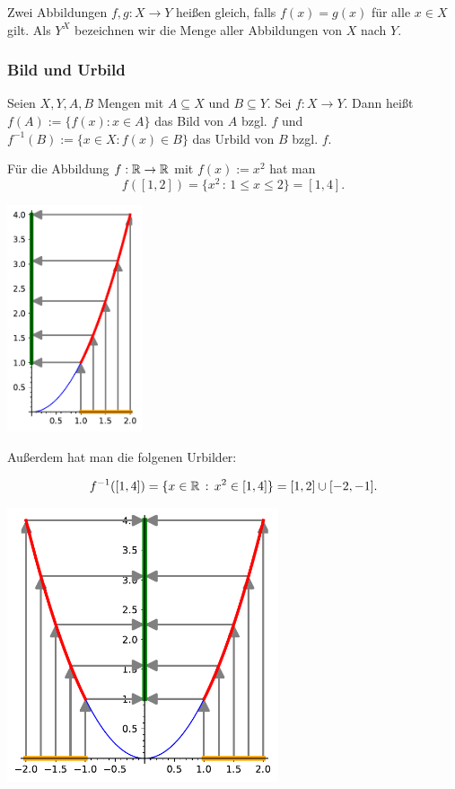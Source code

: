 Zwei Abbildungen $ f,g : X \to Y $ heißen gleich, falls $ f(x) = g(x) $ für alle $ x \in X $ gilt. Als $ Y^X $ bezeichnen wir die Menge aller Abbildungen von $ X $ nach $ Y $.

\subsubsection{Bild und Urbild}

Seien $ X,Y,A,B $ Mengen mit $ A \subseteq X $ und $ B \subseteq Y $. Sei $ f : X \to Y $. Dann heißt $ f(A) := \{ f(x) : x \in A \} $ das Bild von $ A $ bzgl. $ f $ und $ f^{-1}(B) := \{ x \in X : f(x) \in B \} $ das Urbild von $ B $ bzgl. $ f $.

\begin{bsp}
	Für die Abbildung $ f : \mathbb R \to \mathbb R $ mit $ f(x) := x^2 $ hat man 
	\[
		 f( [1,2] ) = \{ x^2 \,:\, 1 \le x \le 2\} = [1,4] .
	\]
\begin{center}
	\includegraphics[width=0.3\textwidth]{sage/bild_abb.pdf}
\end{center} 
	
	Außerdem hat man die folgenen Urbilder: 
	
	\[
		 f^{-1}( [1,4] ) = \{ x \in \mathbb R \,:\, x^2  \in [1,4] \} = [1,2] \cup [-2,-1] .
	\] 
\begin{center}
	\includegraphics[width=0.6\textwidth]{sage/urbild_abb.pdf}
\end{center} 


\end{bsp}
